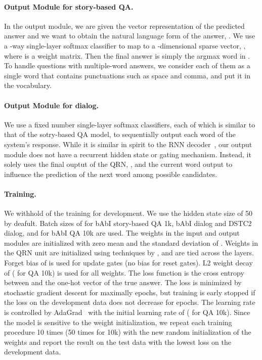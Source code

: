 \documentclass[table]{article}
\begin{document}
\paragraph{Output Module for story-based QA.} In the output module, we are given the vector representation of the predicted answer  and we want to obtain the natural language form of the answer, .
We use a -way single-layer softmax classifier to map  to a -dimensional sparse vector, , where  is a weight matrix.
Then the final answer  is simply the argmax word in . 
To handle questions with multiple-word answers, we consider each of them as a single word that contains punctuations such as space and comma, and put it in the vocabulary.

\paragraph{Output Module for dialog.}
We use a fixed number single-layer softmax classifiers, each of which is similar to that of the sotry-based QA model, to sequentially output each word of the system's response.
While it is similar in spirit to the RNN decoder~\citep{GRU}, our output module does not have a recurrent hidden state or gating mechanism.
Instead, it solely uses the final ouptut of the QRN, , and the current word output to influence the prediction of the next word among possible candidates.





\paragraph{Training.} 
We withhold  of the training  for development.
We use the hidden state size of 50 by deafult.
Batch sizes of  for bAbI story-based QA 1k, bAbI dialog and DSTC2 dialog, and  for bAbI QA 10k are used.
The weights in the input and output modules are initialized with zero mean and the standard deviation  of .
Weights in the QRN unit are initialized using techniques by \citet{glorot2010understanding}, and are tied across the layers.
Forget bias of  is used for update gates (no bias for reset gates).
L2 weight decay of  ( for QA 10k) is used for all weights.
The loss function is the cross entropy between  and the one-hot vector of the true answer.
The loss is minimized by stochastic gradient descent for maximally  epochs, but training is early stopped if the loss on the development data does not decrease for  epochs.
The learning rate is controlled by AdaGrad~\citep{duchi2011adaptive}
with the initial learning rate of  ( for QA 10k).
Since the model is sensitive to the weight initialization,
we repeat each training procedure 10 times (50 times for 10k) with the new random initialization of the weights and report the result on the test data with the lowest loss on the development data.
\end{document}
